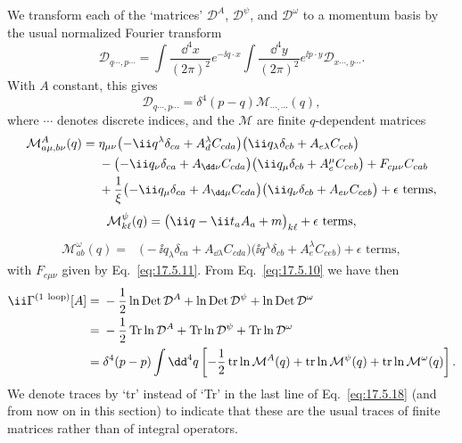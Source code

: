 We transform each of the `matrices' $\mathcal D^A$, $\mathcal D^\psi$, and
$\mathcal D^\omega$ to a momentum basis by the usual normalized Fourier transform
\begin{equation}
\mathcal D_{q\cdots,p\cdots}
=\int\frac{\dd^4x}{(2\pi)^2}e^{-\ii q\cdot x}
 \int\frac{\dd^4y}{(2\pi)^2}e^{\ii p\cdot y}\mathcal D_{x\cdots,y\cdots}.
\label{eq:17.5.13}
\end{equation}
With $A$ constant, this gives
\begin{equation}
\mathcal D_{q\cdots,p\cdots}=\delta^4(p-q)\mathcal M_{\cdots,\cdots}(q),
\label{eq:17.5.14}
\end{equation}
where $\cdots$ denotes discrete indices, and the $\mathcal M$ are finite
$q$-dependent matrices
\begin{align}
\mathcal M^A_{a\mu,b\nu}(q)={}&
\eta_{\mu\nu}\bigl(-\ii q^\lambda\delta_{ca}
+A_d^\lambda C_{cda}\bigr)
\bigl(\ii q_\lambda\delta_{cb}
+A_{e\lambda}C_{ceb}\bigr)
\notag\\
&-\bigl(-\ii q_\nu\delta_{ca}
+A_{\dd\nu}C_{cda}\bigr)
\bigl(\ii q_\mu\delta_{cb}
+A_e^\mu C_{ceb}\bigr)
+F_{c\mu\nu}C_{cab}
\notag\\
&+\frac1\xi\bigl(-\ii q_\mu\delta_{ca}
+A_{\dd\mu}C_{cda}\bigr)
\bigl(\ii q_\nu\delta_{cb}
+A_{e\nu}C_{ceb}\bigr)
+\epsilon\text{ terms},
\label{eq:17.5.15}
\end{align}
\begin{equation}
\mathcal M^\psi_{k\ell}(q)
=\bigl(\ii\sl q-\ii t_a\sl A_a+m\bigr)_{k\ell}
+\epsilon\text{ terms},
\label{eq:17.5.16}
\end{equation}
\begin{align}
\mathcal M^\omega_{ab}(q)={}&
\bigl(-\ii q_\lambda\delta_{ca}
+A_{\dd\lambda}C_{cda}\bigr)
\bigl(\ii q^\lambda\delta_{cb}
+A_e^\lambda C_{ceb}\bigr)
+\epsilon\text{ terms},
\label{eq:17.5.17}
\end{align}
with $F_{c\mu\nu}$ given by Eq.~\eqref{eq:17.5.11}. From
Eq.~\eqref{eq:17.5.10} we have then
\begin{align}
\ii\Gamma^{(1\ \mathrm{loop})}[A]
={}&-\frac12\ln\operatorname{Det}\mathcal D^A
+\ln\operatorname{Det}\mathcal D^\psi
+\ln\operatorname{Det}\mathcal D^\omega
\notag\\
={}&-\frac12\operatorname{Tr}\ln\mathcal D^A
+\operatorname{Tr}\ln\mathcal D^\psi
+\operatorname{Tr}\ln\mathcal D^\omega
\notag\\
={}&\delta^4(p-p)\int \dd^4q\left[-\frac12\operatorname{tr}\ln\mathcal M^A(q)
+\operatorname{tr}\ln\mathcal M^\psi(q)
+\operatorname{tr}\ln\mathcal M^\omega(q)\right].
\label{eq:17.5.18}
\end{align}
We denote traces by `tr' instead of `Tr' in the last line of
Eq.~\eqref{eq:17.5.18} (and from now on in this section) to indicate that
these are the usual traces of finite matrices rather than of integral operators.

